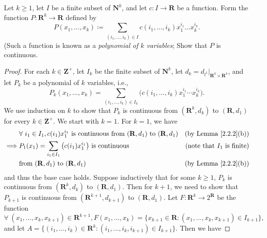 \begin{exercise}\label{ex 2.2.7}
    Let \(k \geq 1\), let \(I\) be a finite subset of \(\mathbf{N}^k\), and let \(c : I \to \mathbf{R}\) be a function.
    Form the function \(P : \mathbf{R}^k \to \mathbf{R}\) defined by
    \[
        P(x_1, \dots, x_k) \coloneqq \sum_{(i_1, \dots, i_k) \in I} c(i_1, \dots, i_k) x_1^{i_1} \dots x_k^{i_k}.
    \]
    (Such a function is known as a \emph{polynomial of \(k\) variables};
    Show that \(P\) is continuous.
\end{exercise}

\begin{proof}
    For each \(k \in \mathbf{Z}^+\), let \(I_k\) be the finite subset of \(\mathbf{N}^k\), let \(d_k = d_{l^1}|_{\mathbf{R}^k \times \mathbf{R}^k}\), and let \(P_k\) be a polynomial of \(k\) variables, i.e.,
    \[
        P_k(x_1, \dots, x_k) = \sum_{(i_1, \dots, i_k) \in I_k} \big(c(i_1, \dots, i_k) x_1^{i_1} \cdots x_k^{i_k}\big).
    \]
    We use induction on \(k\) to show that \(P_k\) is continuous from \((\mathbf{R}^k, d_k)\) to \((\mathbf{R}, d_1)\) for every \(k \in \mathbf{Z}^+\).
    We start with \(k = 1\).
    For \(k = 1\), we have
    \begin{align*}
                 & \forall\ i_1 \in I_1, c(i_1) x_1^{i_1} \text{ is continuous from } (\mathbf{R}, d_1) \text{ to } (\mathbf{R}, d_1) & \text{(by Lemma \ref{2.2.2}(b))}     \\
        \implies & P_1(x_1) = \sum_{i_1 \in I_1} \big(c(i_1) x_1^{i_1}\big) \text{ is continuous}                                     & \text{(note that \(I_1\) is finite)} \\
                 & \text{from } (\mathbf{R}, d_1) \text{ to } (\mathbf{R}, d_1)                                                       & \text{(by Lemma \ref{2.2.2}(b))}
    \end{align*}
    and thus the base case holds.
    Suppose inductively that for some \(k \geq 1\), \(P_k\) is continuous from \((\mathbf{R}^k, d_k)\) to \((\mathbf{R}, d_1)\).
    Then for \(k + 1\), we need to show that \(P_{k + 1}\) is continuous from \((\mathbf{R}^{k + 1}, d_{k + 1})\) to \((\mathbf{R}, d_1)\).
    Let \(F : \mathbf{R}^k \to 2^\mathbf{R}\) be the function
    \[
        \forall\ (x_1, \dots, x_k, x_{k + 1}) \in \mathbf{R}^{k + 1}, F(x_1, \dots, x_k) = \big\{x_{k + 1} \in \mathbf{R} : (x_1, \dots, x_k, x_{k + 1}) \in I_{k + 1}\big\},
    \]
    and let \(A = \big\{(i_1, \dots, i_k) \in \mathbf{R}^k : (i_1, \dots, i_k, i_{k + 1}) \in I_{k + 1}\big\}\).
    Then we have

\end{proof}
